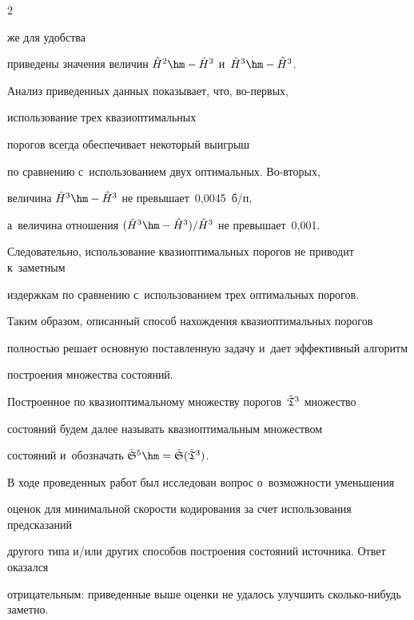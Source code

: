 \begin{multicols}{2}
{\vspace*{12pt}

}



\addtocounter{table}{1}



\noindent

же для удобства 

приведены значения величин $\hat{H}^2\hm-\tilde{H}^3$ и~$\tilde{H}^3\hm-\hat{H}^3$.



Анализ приведенных данных показывает, что, во-пер\-вых, 

использование трех квазиоптимальных 

 порогов всегда обеспечивает некоторый выигрыш 

по сравнению с~использованием двух оптимальных. Во-вто\-рых, 

величина $\tilde{H}^3\hm-\hat{H}^3$  не превышает~0,0045~б/п, 

а~величина отношения $(\tilde{H}^3\hm-\hat{H}^3)/\hat{H}^3$ не превышает~0,001. 

Следовательно, использование квазиоптимальных порогов не приводит к~заметным 

издержкам по сравнению с~использованием трех оптимальных порогов. 



Таким образом, описанный способ нахождения квазиоптимальных порогов 

полностью решает основную поставленную задачу и~дает эффективный алгоритм 

построения множества состояний.



Построенное по квазиоптимальному множеству порогов~$\tilde{\frak T}^3$ множество 

состояний будем далее называть квазиоптимальным множеством 

состояний и~обозначать $\tilde{\frak S}^5\hm=\tilde{\frak S}(\tilde{\frak T}^3)$.



В ходе проведенных работ был исследован вопрос о~возможности уменьшения 

оценок для минимальной скорости кодирования за счет использования предсказаний 

другого типа и/или других способов построения состояний источника. Ответ оказался 

отрицательным: приведенные выше оценки не удалось улучшить сколь\-ко-ни\-будь заметно.


\end{multicols}
